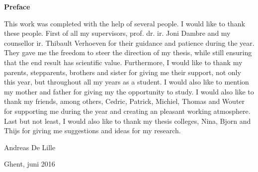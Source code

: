 
\newpage

\noindent \textbf{\huge Preface}

\vspace{1.5cm}

\noindent

This work was completed with the help of several people. I would like to thank these people. First of all my supervisors, prof. dr. ir. Joni Dambre and my counsellor ir. Thibault Verhoeven for their guidance and patience during the year. They gave me the freedom to steer the direction of my thesis, while still ensuring that the end result has scientific value.
\npar
Furthermore, I would like to thank my parents, stepparents, brothers and sister for giving me their support, not only this year, but throughout all my years as a student. I would also like to mention my mother and father for giving my the opportunity to study.
\npar
I would also like to thank my friends, among others, Cedric, Patrick, Michiel, Thomas and Wouter for supporting me during the year and creating an pleasant working atmosphere. 
\npar
Last but not least, I would also like to thank my thesis colleges, Nina, Bjorn and Thijs for giving me suggestions and ideas for my research.

\addvspace{3cm}

\hfill \noindent Andreas De Lille

\hfill \noindent Ghent, juni 2016


\addvspace{9cm}

\doclicenseThis